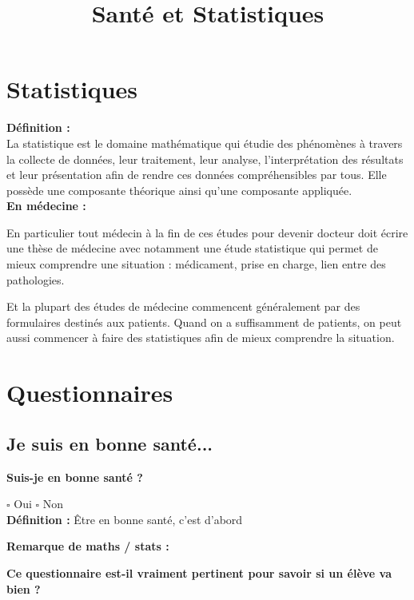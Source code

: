 




\title{Santé et Statistiques}

\section{Statistiques}

\textbf{Définition :} \\

La statistique est le domaine mathématique qui étudie des phénomènes à travers la collecte de données, leur traitement, leur analyse, l'interprétation des résultats et leur présentation afin de rendre ces données compréhensibles par tous. Elle possède une composante théorique ainsi qu'une composante appliquée. \\

\textbf{En médecine :}

En particulier tout médecin à la fin de ces études pour devenir docteur doit écrire une thèse de médecine avec notamment une étude statistique qui permet de mieux comprendre une situation : médicament, prise en charge, lien entre des pathologies.

Et la plupart des études de médecine commencent généralement par des formulaires destinés aux patients. Quand on a suffisamment de patients, on peut aussi commencer à faire des statistiques afin de mieux comprendre la situation. \\

\section{Questionnaires}

\subsection{Je suis en bonne santé...}

\textbf{Suis-je en bonne santé ?}

$\square$ Oui \hspace{1cm} $\square$ Non \\

\textbf{Définition :} Être en bonne santé, c'est d'abord \dotfill \\
\Pointilles[2]

\textbf{Remarque de maths / stats :} \\
\Pointilles[4]

\textbf{Ce questionnaire est-il vraiment pertinent pour savoir si un élève va bien ?}


